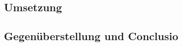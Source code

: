 \begin{spacing}{1}
\chapter{Umsetzung}\label{chapter:implementation}
\end{spacing}


\begin{spacing}{1}
\chapter{Gegenüberstellung und Conclusio}
\end{spacing}


\newpage
{}
\setcounter{page}{\value{RPages}}

\glsnogroupskiptrue
\printglossary[title=Glossar,toctitle=Glossar] %
\listoffigures
\listoftables
\lstlistoflistings
\appendix
{}


